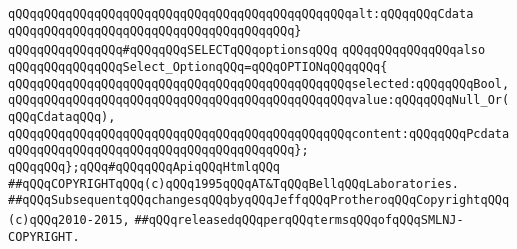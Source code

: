 \verb|qQQqqQQqqQQqqQQqqQQqqQQqqQQqqQQqqQQqqQQqqQQqqQQqalt:qQQqqQQqCdata|\newline
\verb|qQQqqQQqqQQqqQQqqQQqqQQqqQQqqQQqqQQqqQQq}|\newline
\newline
\verb|qQQqqQQqqQQqqQQq#qQQqqQQqSELECTqQQqoptionsqQQq|\newline
\verb|qQQqqQQqqQQqqQQqalso|\newline
\verb|qQQqqQQqqQQqqQQqSelect_OptionqQQq=qQQqOPTIONqQQqqQQq{|\newline
\verb|qQQqqQQqqQQqqQQqqQQqqQQqqQQqqQQqqQQqqQQqqQQqqQQqselected:qQQqqQQqBool,|\newline
\verb|qQQqqQQqqQQqqQQqqQQqqQQqqQQqqQQqqQQqqQQqqQQqqQQqvalue:qQQqqQQqNull_Or(qQQqCdataqQQq),|\newline
\verb|qQQqqQQqqQQqqQQqqQQqqQQqqQQqqQQqqQQqqQQqqQQqqQQqcontent:qQQqqQQqPcdata|\newline
\verb|qQQqqQQqqQQqqQQqqQQqqQQqqQQqqQQqqQQqqQQq};|\newline
\newline
\verb|qQQqqQQq};qQQq#qQQqqQQqApiqQQqHtmlqQQq|\newline
\newline
\newline
\newline
\verb|##qQQqCOPYRIGHTqQQq(c)qQQq1995qQQqAT&TqQQqBellqQQqLaboratories.|\newline
\verb|##qQQqSubsequentqQQqchangesqQQqbyqQQqJeffqQQqProtheroqQQqCopyrightqQQq(c)qQQq2010-2015,|\newline
\verb|##qQQqreleasedqQQqperqQQqtermsqQQqofqQQqSMLNJ-COPYRIGHT.|\newline

